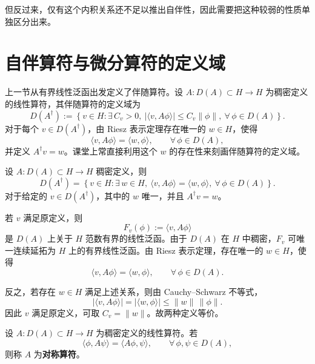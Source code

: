\documentclass[UTF8,a4paper,11pt,openany]{ctexbook}
\begin{document}
但反过来，仅有这个内积关系还不足以推出自伴性，因此需要把这种较弱的性质单独区分出来。


\section{自伴算符与微分算符的定义域}

上一节从有界线性泛函出发定义了伴随算符。设 $A:D(A)\subset H\to H$ 为稠密定义的线性算符，其伴随算符的定义域为
\begin{equation}
    D(A^\dagger)
    :=
    \left\{
    v\in H:
    \exists\,C_v>0,\ 
    |\langle v,A\phi\rangle|
    \leq C_v\|\phi\|,
    \ \forall\,\phi\in D(A)
    \right\}.
\end{equation}
对于每个 $v\in D(A^\dagger)$，由 Riesz 表示定理存在唯一的 $w\in H$，使得
\[
\langle v,A\phi\rangle
=
\langle w,\phi\rangle,
\qquad
\forall\,\phi\in D(A),
\]
并定义 $A^\dagger v=w$。课堂上常直接利用这个 $w$ 的存在性来刻画伴随算符的定义域。

\begin{proposition}[伴随算符定义的等价刻画]
设 $A:D(A)\subset H\to H$ 稠密定义，则
\begin{equation}
    D(A^\dagger)
    =
    \left\{
    v\in H:
    \exists\,w\in H,\ 
    \langle v,A\phi\rangle
    =
    \langle w,\phi\rangle,
    \ \forall\,\phi\in D(A)
    \right\}.
\end{equation}
对于给定的 $v\in D(A^\dagger)$，其中的 $w$ 唯一，并且 $A^\dagger v=w$。
\end{proposition}

\begin{proofblock}
若 $v$ 满足原定义，则
\[
F_v(\phi):=\langle v,A\phi\rangle
\]
是 $D(A)$ 上关于 $H$ 范数有界的线性泛函。由于 $D(A)$ 在 $H$ 中稠密，$F_v$ 可唯一连续延拓为 $H$ 上的有界线性泛函。由 Riesz 表示定理，存在唯一的 $w\in H$，使得
\[
\langle v,A\phi\rangle
=
\langle w,\phi\rangle,
\qquad
\forall\,\phi\in D(A).
\]

反之，若存在 $w\in H$ 满足上述关系，则由 Cauchy--Schwarz 不等式，
\[
|\langle v,A\phi\rangle|
=
|\langle w,\phi\rangle|
\leq
\|w\|\,\|\phi\|.
\]
因此 $v$ 满足原定义，可取 $C_v=\|w\|$。故两种定义等价。
\end{proofblock}

\begin{definition}[对称算符]
设 $A:D(A)\subset H\to H$ 为稠密定义的线性算符。若
\begin{equation}
    \langle \phi,A\psi\rangle
    =
    \langle A\phi,\psi\rangle,
    \qquad
    \forall\,\phi,\psi\in D(A),
\end{equation}
则称 $A$ 为\textbf{对称算符}。
\end{definition}
\end{document}
